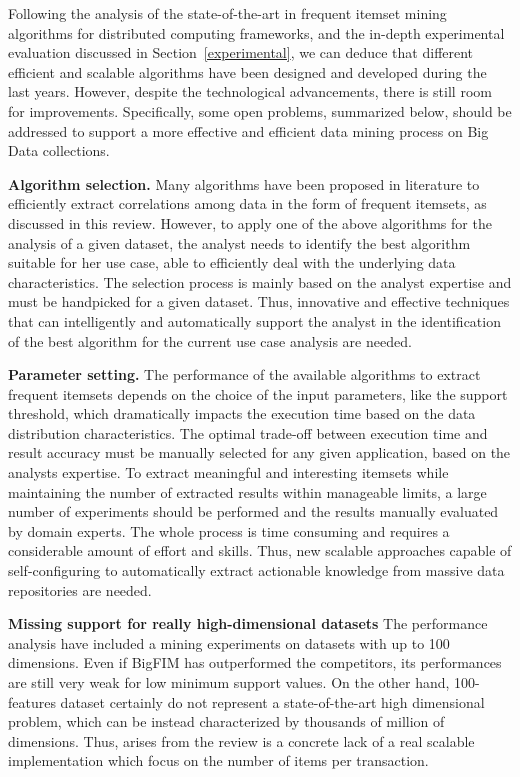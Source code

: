 
Following the analysis of the state-of-the-art in frequent itemset mining
algorithms for distributed computing frameworks, and the in-depth experimental
evaluation discussed in Section~\ref{experimental},
we can deduce that different efficient and scalable
algorithms have been designed and developed during the last years.
However, despite the technological advancements, there is still room for
improvements. Specifically,
some open problems, summarized below, should be addressed to support
a more effective and efficient data mining process on Big Data collections.

\textbf{Algorithm selection.}
Many algorithms have been proposed in literature
to efficiently extract correlations among data in the form of frequent itemsets,
as discussed in this review.
However, to apply one of the above algorithms for the analysis of a given
dataset, the analyst needs to identify
the best algorithm suitable for her use case,
able to efficiently deal with the
underlying data characteristics.
The selection process is mainly based on the analyst expertise and must be
handpicked for a given dataset.
Thus, innovative and effective techniques that can intelligently and
automatically support the analyst in the identification of the best algorithm
for the current use case analysis are needed.

\textbf{Parameter setting.}
The performance of the available algorithms to extract frequent
itemsets depends on the choice of the input parameters, like the support
threshold, which dramatically impacts the execution time based on the data
distribution characteristics. The optimal trade-off between execution time and
result accuracy must be manually selected for any given application, based on
the
analysts expertise.
To extract meaningful and interesting itemsets while maintaining the
number of extracted results within manageable limits, a large number of
experiments should be performed and the results
manually evaluated by domain experts.
The whole process is time consuming and requires a considerable
amount of effort and skills. Thus, new scalable approaches
capable of self-configuring to automatically extract actionable
knowledge from massive data repositories
are needed.

\textbf{Missing support for really high-dimensional datasets}
The performance analysis have included a mining experiments on datasets with 
up to 100 dimensions. Even if BigFIM has outperformed the competitors, its performances
are still very weak for low minimum support values. On the other hand, 100-features dataset certainly
do not represent a state-of-the-art high dimensional problem, which can be instead characterized by thousands of million of dimensions.
Thus, arises from the review is a concrete lack of a real scalable implementation which focus on the number of
items per transaction. 

